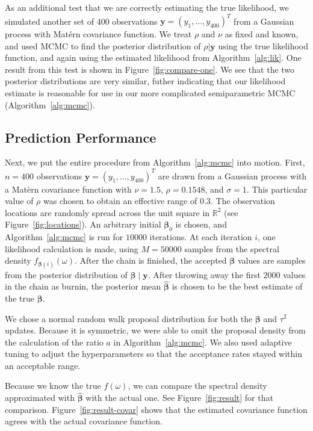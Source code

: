 \documentclass[12pt]{article}
\begin{document}
As an additional test that we are correctly estimating the true likelihood, we simulated another set of 400 observations $\bm{y} = (y_1, \dots, y_{400})^T$ from a Gaussian process with Mat\'ern covariance function. We treat $\rho$ and $\nu$ as fixed and known, and used MCMC to find the posterior distribution of $\rho|\bm{y}$ using the true likelihood function, and again using the estimated likelihood from Algorithm~\ref{alg:lik}. One result from this test is shown in Figure~\ref{fig:compare-one}. We see that the two posterior distributions are very similar, futher indicating that our likelihood estimate is reasonable for use in our more complicated semiparametric MCMC (Algorithm~\ref{alg:mcmc}).

\subsection{Prediction Performance} %
\label{sec:prediction_performance}

Next, we put the entire procedure from Algorithm~\ref{alg:mcmc} into motion. First, $n = 400$ observations $\bm{y} = (y_1, \dots, y_{400})^T$ are drawn from a Gaussian process with a Mat\`{e}rn covariance function with $\nu = 1.5$, $\rho = 0.1548$, and $\sigma = 1$. This particular value of $\rho$ was chosen to obtain an effective range of 0.3. The observation locations are randomly spread across the unit square in $\mathbb{R}^2$ (see Figure~\ref{fig:locations}). An arbitrary initial $\bm{\beta}_0$ is chosen, and Algorithm~\ref{alg:mcmc} is run for $10000$ iterations. At each iteration $i$, one likelihood calculation is made, using $M = 50000$ samples from the spectral density $f_{\bm{\beta}(i)}(\omega)$. After the chain is finished, the accepted $\bm{\beta}$ values are samples from the posterior distribution of $\bm{\beta} \;|\; \bm{y}$. After throwing away the first $2000$ values in the chain as burnin, the posterior mean $\widehat{\bm{\beta}}$ is chosen to be the best estimate of the true $\bm{\beta}$.

We chose a normal random walk proposal distribution for both the $\bm{\beta}$ and $\tau^2$ updates. Because it is symmetric, we were able to omit the proposal density from the calculation of the ratio $a$ in Algorithm~\ref{alg:mcmc}. We also used adaptive tuning to adjust the hyperparameters so that the acceptance rates stayed within an acceptable range.

Because we know the true $f(\omega)$, we can compare the spectral density approximated with $\widehat{\bm{\beta}}$ with the actual one. See Figure~\ref{fig:result} for that comparison. Figure~\ref{fig:result-covar} shows that the estimated covariance function agrees with the actual covariance function.
\end{document}
